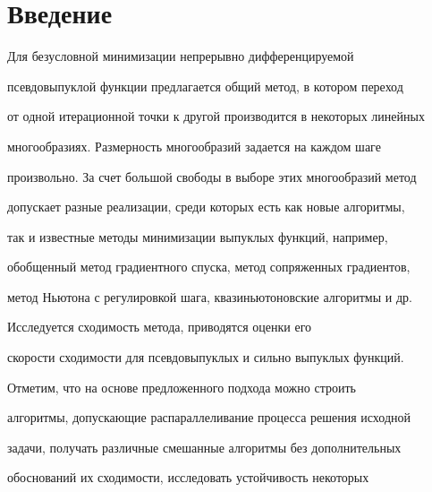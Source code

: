 \pagestyle{plain} %













\maketitle


\label{begin}





\section*{Введение}





Для безусловной минимизации непрерывно дифференцируемой 


псевдовыпуклой функции предлагается общий метод, в котором переход


от одной итерационной точки к другой производится в некоторых линейных


многообразиях. Размерность многообразий задается на каждом шаге 


произвольно. За счет большой свободы в выборе этих многообразий метод


допускает разные реализации, среди которых есть как новые алгоритмы, 


так и известные методы минимизации выпуклых функций, например,


обобщенный метод градиентного спуска, метод сопряженных градиентов, 


метод Ньютона с регулировкой шага, квазиньютоновские алгоритмы и др.


Исследуется сходимость метода, приводятся оценки его


скорости сходимости для псевдовыпуклых и сильно выпуклых функций. 


Отметим, что на основе предложенного подхода можно строить


алгоритмы, допускающие распараллеливание процесса решения исходной 


задачи, получать различные смешанные алгоритмы без дополнительных 


обоснований их сходимости, исследовать устойчивость некоторых



